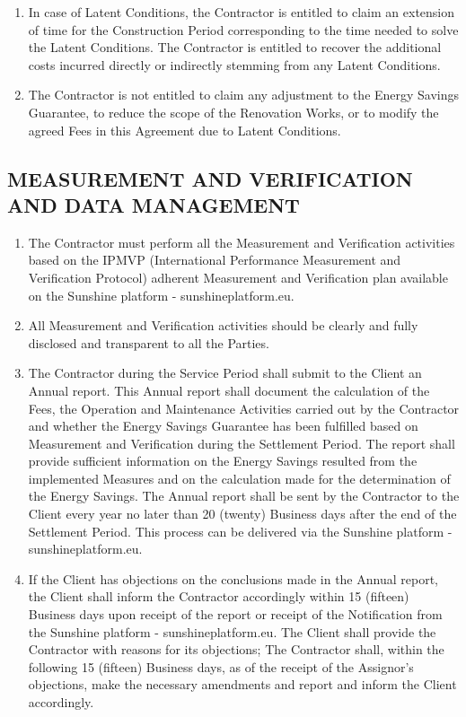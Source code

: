 \begin{multicols}{2}
\begin{enumerate}
	\item	In case of Latent Conditions, the Contractor is entitled to claim an extension of time for the Construction Period corresponding to the time needed to solve the Latent Conditions. The Contractor is entitled to recover the additional costs incurred directly or indirectly stemming from any Latent Conditions.
	\item	The Contractor is not entitled to claim any adjustment to the Energy Savings Guarantee, to reduce the scope of the Renovation Works, or to modify the agreed Fees in this Agreement due to Latent Conditions.
\end{enumerate}

\subsection{MEASUREMENT AND VERIFICATION AND DATA MANAGEMENT}
\begin{enumerate}
	\item	The Contractor must perform all the Measurement and Verification activities based on the IPMVP (International Performance Measurement and Verification Protocol) adherent Measurement and Verification plan available on the Sunshine platform - sunshineplatform.eu.
	\item	All Measurement and Verification activities should be clearly and fully disclosed and transparent to all the Parties.
	\item	The Contractor during the Service Period shall submit to the Client an Annual report. This Annual report shall document the calculation of the Fees, the Operation and Maintenance Activities carried out by the Contractor and whether the Energy Savings Guarantee has been fulfilled based on Measurement and Verification during the Settlement Period. The report shall provide sufficient information on the Energy Savings resulted from the implemented Measures and on the calculation made for the determination of the Energy Savings. The Annual report shall be sent by the Contractor to the Client every year no later than 20 (twenty) Business days after the end of the Settlement Period. This process can be delivered via the Sunshine platform - sunshineplatform.eu.
	\item	If the Client has objections on the conclusions made in the Annual report, the Client shall inform the Contractor accordingly within 15 (fifteen) Business days upon receipt of the report or receipt of the Notification from the Sunshine platform - sunshineplatform.eu. The Client shall provide the Contractor with reasons for its objections; The Contractor shall, within the following 15 (fifteen) Business days, as of the receipt of the Assignor’s objections, make the necessary amendments and report and inform the Client accordingly.

\end{enumerate}
\end{multicols}
